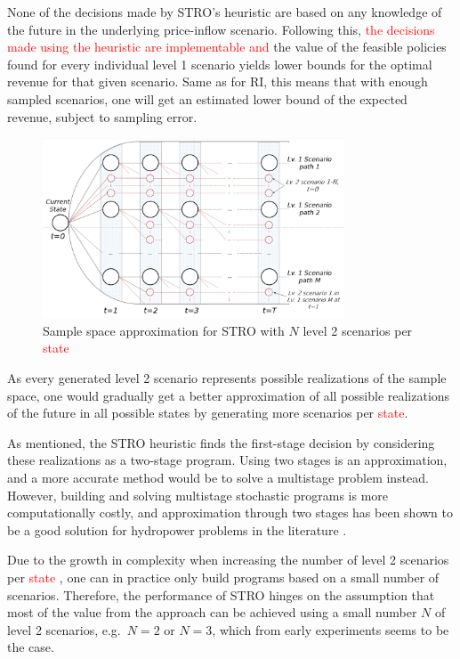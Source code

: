 None of the decisions made by STRO's heuristic are based on any knowledge of the future in the underlying price-inflow scenario. Following this, \textcolor{red}{the decisions made using the heuristic are implementable and} the value of the feasible policies found for every individual level 1 scenario yields lower bounds for the optimal revenue for that given scenario. Same as for RI, this means that with enough sampled scenarios, one will get an estimated lower bound of the expected revenue, subject to sampling error.
\begin{figure}[H]
    \centering
    \includegraphics[width=0.8\textwidth]{discretizeRSP.png}
    \caption{Sample space approximation for STRO with  $N$ level 2 scenarios per \textcolor{red}{state} }
    \label{fig:RSP state space}
\end{figure}

As every generated level 2 scenario represents possible realizations of the sample space, one would gradually get a better approximation of all possible realizations of the future in all possible states by generating more scenarios per \textcolor{red}{state}.

As mentioned, the STRO heuristic finds the first-stage decision by considering these realizations as a two-stage program. Using two stages is an approximation, and a more accurate method would be to solve a multistage problem instead. However, building and solving multistage stochastic programs is more computationally costly, and approximation through two stages has been shown to be a good solution for hydropower problems in the literature \cite{SeAC17}. 

Due to the growth in complexity when increasing the number of level 2 scenarios per \textcolor{red}{state} , one can in practice only build programs based on a small number of scenarios. Therefore, the performance of STRO hinges on the assumption that most of the value from the approach can be achieved using a small number $N$ of level 2 scenarios, e.g.\ $N=2$ or $N=3$, which from early experiments seems to be the case.

